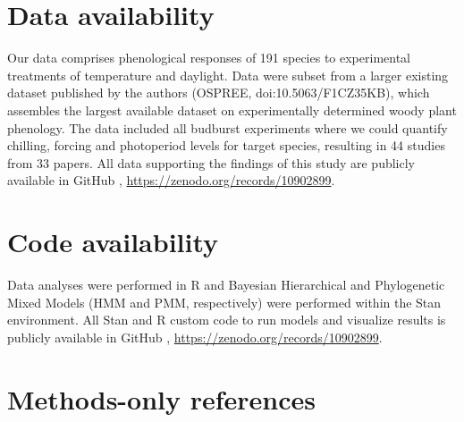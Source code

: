 \documentclass[11pt]{article}
\begin{document}
\section*{Data availability}
Our data comprises phenological responses of 191 species to experimental treatments of temperature and daylight. Data were subset from a larger existing dataset published by the authors (OSPREE, doi:10.5063/F1CZ35KB), which assembles the largest available dataset on experimentally determined woody plant phenology. The data included all budburst experiments where we could quantify chilling, forcing and photoperiod levels for target species, resulting in 44 studies from 33 papers. All data supporting the findings of this study are publicly available in GitHub \citep{MoralesCastilla2024}, \url{https://zenodo.org/records/10902899}.

\section*{Code availability}
Data analyses were performed in R and Bayesian Hierarchical and Phylogenetic Mixed Models (HMM and PMM, respectively) were performed within the Stan environment. All Stan and R custom code to run models and visualize results is publicly available in GitHub \citep{MoralesCastilla2024}, \url{https://zenodo.org/records/10902899}.

\clearpage
\section*{Methods-only references} 
%
%
\end{document}
